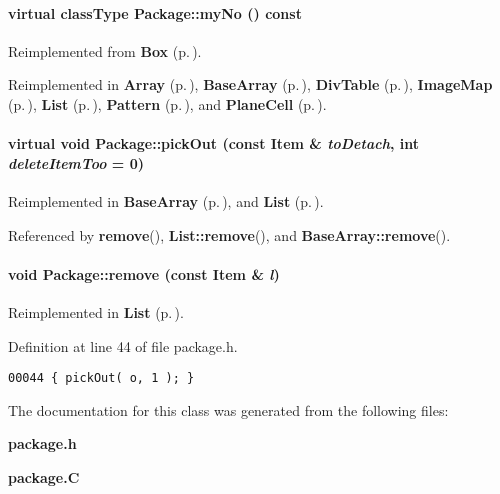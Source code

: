 \paragraph{\setlength{\rightskip}{0pt plus 5cm}virtual {\bf class\-Type} Package::my\-No () const\hspace{0.3cm}{\tt  [pure virtual]}}\hfill



Reimplemented from {\bf Box} {\rm (p.\,\pageref{Box_a4})}.

Reimplemented in {\bf Array} {\rm (p.\,\pageref{Array_a5})}, {\bf Base\-Array} {\rm (p.\,\pageref{BaseArray_a10})}, {\bf Div\-Table} {\rm (p.\,\pageref{DivTable_a2})}, {\bf Image\-Map} {\rm (p.\,\pageref{ImageMap_a2})}, {\bf List} {\rm (p.\,\pageref{List_a6})}, {\bf Pattern} {\rm (p.\,\pageref{Pattern_a2})}, and {\bf Plane\-Cell} {\rm (p.\,\pageref{PlaneCell_a2})}.\label{Package_a3}
\paragraph{\setlength{\rightskip}{0pt plus 5cm}virtual void Package::pick\-Out (const {\bf Item} \& {\em to\-Detach}, int {\em delete\-Item\-Too} = 0)\hspace{0.3cm}{\tt  [pure virtual]}}\hfill



Reimplemented in {\bf Base\-Array} {\rm (p.\,\pageref{BaseArray_a9})}, and {\bf List} {\rm (p.\,\pageref{List_a4})}.

Referenced by {\bf remove}(), {\bf List::remove}(), and {\bf Base\-Array::remove}().\label{Package_a7}
\paragraph{\setlength{\rightskip}{0pt plus 5cm}void Package::remove (const {\bf Item} \& {\em l})\hspace{0.3cm}{\tt  [inline]}}\hfill



Reimplemented in {\bf List} {\rm (p.\,\pageref{List_a5})}.

Definition at line 44 of file package.h.\small\begin{verbatim}00044 { pickOut( o, 1 ); }
\end{verbatim}\normalsize 


The documentation for this class was generated from the following files:\begin{CompactItemize}
\item 
{\bf package.h}\item 
{\bf package.C}\end{CompactItemize}
